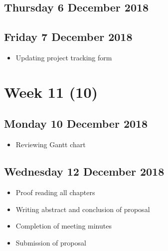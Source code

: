 \subsection*{Thursday 6 December 2018}
\begin{itemize}

\end{itemize}

\subsection*{Friday 7 December 2018}
\begin{itemize}
	\item Updating project tracking form
\end{itemize}

\section*{Week 11 (10)}
\subsection*{Monday 10 December 2018}
\begin{itemize}
	\item Reviewing Gantt chart
\end{itemize}

\subsection*{Wednesday 12 December 2018}
\begin{itemize}
	\item Proof reading all chapters
	\item Writing abstract and conclusion of proposal
	\item Completion of meeting minutes
	\item Submission of proposal
\end{itemize}
